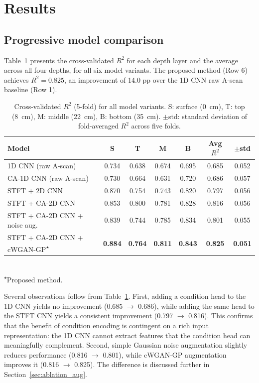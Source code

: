 \documentclass[review]{elsarticle}
\begin{document}
\section{Results}
\label{sec:results}

\subsection{Progressive model comparison}
\label{sec:main_results}

Table~\ref{tab:main_results} presents the cross-validated $R^2$ for each depth layer and the average across all four depths, for all six model variants. The proposed method (Row 6) achieves $R^2 = 0.825$, an improvement of 14.0 pp over the 1D CNN raw A-scan baseline (Row 1).

\begin{table}[htbp]
\centering
\caption{Cross-validated $R^2$ (5-fold) for all model variants. S: surface (0~cm), T: top (8~cm), M: middle (22~cm), B: bottom (35~cm). $\pm$std: standard deviation of fold-averaged $R^2$ across five folds.}
\label{tab:main_results}
\begin{tabular}{lcccccc}
\toprule
Model & S & T & M & B & Avg $R^2$ & $\pm$std \\
\midrule
1D CNN (raw A-scan)              & 0.734 & 0.638 & 0.674 & 0.695 & 0.685 & 0.052 \\
CA-1D CNN (raw A-scan)           & 0.730 & 0.664 & 0.631 & 0.720 & 0.686 & 0.057 \\
STFT + 2D CNN                    & 0.870 & 0.754 & 0.743 & 0.820 & 0.797 & 0.056 \\
STFT + CA-2D CNN                 & 0.853 & 0.800 & 0.781 & 0.828 & 0.816 & 0.056 \\
STFT + CA-2D CNN + noise aug.    & 0.839 & 0.744 & 0.785 & 0.834 & 0.801 & 0.055 \\
STFT + CA-2D CNN + cWGAN-GP\textsuperscript{$\star$} & \textbf{0.884} & \textbf{0.764} & \textbf{0.811} & \textbf{0.843} & \textbf{0.825} & \textbf{0.051} \\
\bottomrule
\end{tabular}
\\ \smallskip
\small\textsuperscript{$\star$}Proposed method.
\end{table}

Several observations follow from Table~\ref{tab:main_results}. First, adding a condition head to the 1D CNN yields no improvement (0.685 $\to$ 0.686), while adding the same head to the STFT CNN yields a consistent improvement (0.797 $\to$ 0.816). This confirms that the benefit of condition encoding is contingent on a rich input representation: the 1D CNN cannot extract features that the condition head can meaningfully complement. Second, simple Gaussian noise augmentation slightly reduces performance (0.816 $\to$ 0.801), while cWGAN-GP augmentation improves it (0.816 $\to$ 0.825). The difference is discussed further in Section~\ref{sec:ablation_aug}.
\end{document}
